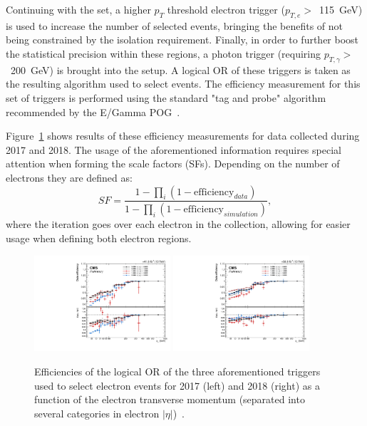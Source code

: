 \hspace{10pt} Continuing with the set, a higher $p_T$ threshold electron trigger ($p_{T,e}>$~115~GeV) is used to increase the number of selected events, bringing the benefits of not being constrained by the isolation requirement. Finally, in order to further boost the statistical precision within these regions, a photon trigger (requiring $p_{T,\gamma}>$~200~GeV) is brought into the setup. A logical OR of these triggers is taken as the resulting algorithm used to select events. The efficiency measurement for this set of triggers is performed using the standard "tag and probe" algorithm recommended by the E/Gamma POG~\cite{twiki:EGamma_tag_and_probe}.

\hspace{10pt} Figure~\ref{fig:hlteff_electron} shows results of these efficiency measurements for data collected during 2017 and 2018. The usage of the aforementioned information requires special attention when forming the scale factors (SFs). Depending on the number of electrons they are defined as:
\begin{equation}
    SF = \frac{1-\prod\limits_{i}(1-\text{efficiency}_{data})}{1-\prod\limits_{i}(1-\text{efficiency}_{simulation})},
\end{equation}
where the iteration goes over each electron in the collection, allowing for easier usage when defining both electron regions.

\begin{figure}[hbtp]
\begin{center}
    \includegraphics[width=0.45\textwidth]{Analysis_strategy/Electron_triggers/electron_trig_eff_2017.pdf}
    \includegraphics[width=0.45\textwidth]{Analysis_strategy/Electron_triggers/electron_trig_eff_2018.pdf}
    \caption{Efficiencies of the logical OR of the three aforementioned triggers used to select electron events for 2017 (left) and 2018 (right) as a function of the electron transverse momentum (separated into several categories in electron $|\eta|$)~\cite{note:AN_19_257}.}
    \label{fig:hlteff_electron}
 \end{center}
 \end{figure}

